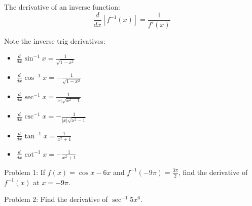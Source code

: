 \documentclass[../abcalc.tex]{subfiles}
\begin{document}
The derivative of an inverse function:
\[\frac{d}{dx}[f^{-1}(x)]=\frac{1}{f'(x)}\]

Note the inverse trig derivatives:
\begin{itemize}
    \item $\frac{d}{dx}\sin^{-1}x = \frac{1}{\sqrt{1-x^2}}$
    \item $\frac{d}{dx}\cos^{-1}x = -\frac{1}{\sqrt{1-x^2}}$
    \item $\frac{d}{dx}\sec^{-1}x = \frac{1}{|x|\sqrt{x^2-1}}$
    \item $\frac{d}{dx}\csc^{-1}x = -\frac{1}{|x|\sqrt{x^2-1}}$
    \item $\frac{d}{dx}\tan^{-1}x = \frac{1}{x^2+1}$
    \item $\frac{d}{dx}\cot^{-1}x = -\frac{1}{x^2+1}$
\end{itemize}

Problem 1: If $f(x)=\cos x - 6x$ and $f^{-1}(-9\pi) = \frac{3\pi}{2}$, find the derivative of $f^{-1}(x)$ at $x=-9\pi$.

Problem 2: Find the derivative of $\sec^{-1}5x^6$.
\end{document}
